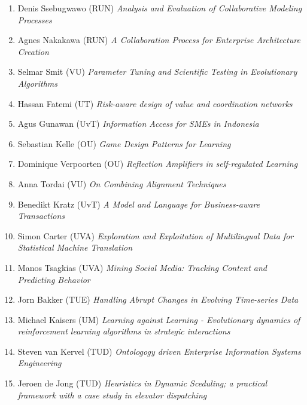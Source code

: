 \begin{multicols}{2}
\begin{scriptsize}
\begin{enumerate}[leftmargin=*,noitemsep,topsep=0pt,parsep=1pt,partopsep=0pt]
{}\item Denis Ssebugwawo (RUN) \textit{Analysis and Evaluation of Collaborative Modeling Processes
}\item Agnes Nakakawa (RUN) \textit{A Collaboration Process for Enterprise Architecture Creation
}\item Selmar Smit (VU) \textit{Parameter Tuning and Scientific Testing in Evolutionary Algorithms 
}\item Hassan Fatemi (UT) \textit{Risk-aware design of value and coordination networks
}\item Agus Gunawan (UvT) \textit{Information Access for SMEs in Indonesia
}\item Sebastian Kelle (OU) \textit{Game Design Patterns for Learning
}\item Dominique Verpoorten (OU) \textit{Reflection Amplifiers in self-regulated Learning 
}\item Anna Tordai (VU) \textit{On Combining Alignment Techniques 
}\item Benedikt Kratz (UvT) \textit{A Model and Language for Business-aware Transactions
}\item Simon Carter (UVA) \textit{Exploration and Exploitation of Multilingual Data for Statistical Machine Translation
}\item Manos Tsagkias (UVA) \textit{Mining Social Media: Tracking Content and Predicting Behavior
}\item Jorn Bakker (TUE) \textit{Handling Abrupt Changes in Evolving Time-series Data
}\item Michael Kaisers (UM) \textit{Learning against Learning - Evolutionary dynamics of reinforcement learning algorithms in strategic interactions
}\item Steven van Kervel (TUD) \textit{Ontologogy driven Enterprise Information Systems Engineering
}\item Jeroen de Jong (TUD) \textit{Heuristics in Dynamic Sceduling; a practical framework with a case study in elevator dispatching}
\end{enumerate}


\end{scriptsize}
\end{multicols}
